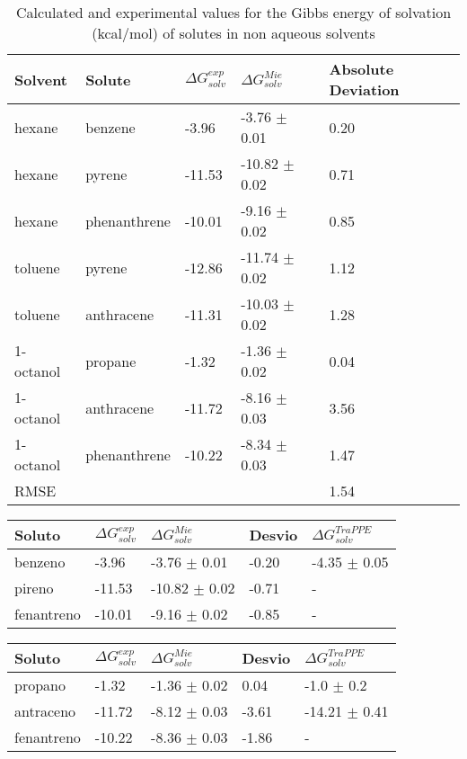 \begin{table*}[h]
\center
  \caption{Calculated and experimental values for the Gibbs energy of solvation (kcal/mol) of solutes in non aqueous solvents}
  \label{tbl:solv1}
  \begin{tabular}{lllll}
    \hline
      Solvent & Solute & $\Delta G_{solv}^{exp}$ & $\Delta G_{solv}^{Mie}$ & Absolute Deviation \\
    \hline
    hexane    & benzene      & -3.96  & -3.76  $\pm$ 0.01 & 0.20 \\
    hexane    & pyrene       & -11.53 & -10.82 $\pm$ 0.02 & 0.71 \\
    hexane    & phenanthrene & -10.01 & -9.16  $\pm$ 0.02 & 0.85 \\
    toluene   & pyrene       & -12.86 & -11.74 $\pm$ 0.02 & 1.12\\
    toluene   & anthracene   & -11.31 & -10.03 $\pm$ 0.02 & 1.28\\
    1-octanol & propane      & -1.32  & -1.36  $\pm$ 0.02 & 0.04 \\
    1-octanol & anthracene   & -11.72 & -8.16  $\pm$ 0.03 & 3.56 \\
    1-octanol & phenanthrene & -10.22 & -8.34  $\pm$ 0.03 & 1.47 \\
    \hline
    RMSE      &              &        &                   & 1.54     \\
    \hline
  \end{tabular}

\end{table*}

\begin{table*}[h]
\center
  \label{tbl:solv1tes}
  \begin{tabular}{lllll}
    \hline
     Soluto & $\Delta G_{solv}^{exp}$ & $\Delta G_{solv}^{Mie}$ & Desvio & $\Delta G_{solv}^{TraPPE}$ \\
    \hline
    benzeno      & -3.96  & -3.76  $\pm$ 0.01 & -0.20 & -4.35 $\pm$ 0.05\\
    pireno       & -11.53 & -10.82 $\pm$ 0.02 & -0.71 & -\\
    fenantreno   & -10.01 & -9.16  $\pm$ 0.02 & -0.85 & -\\
    \hline
  \end{tabular}

\end{table*}

\begin{table*}[h]
\center
  \label{tbl:solv1tes}
  \begin{tabular}{lllll}
    \hline
     Soluto & $\Delta G_{solv}^{exp}$ & $\Delta G_{solv}^{Mie}$ & Desvio & $\Delta G_{solv}^{TraPPE}$\\
    \hline
    propano      & -1.32  & -1.36  $\pm$ 0.02 & 0.04 & -1.0 $\pm$ 0.2\\
    antraceno   & -11.72 & -8.12  $\pm$ 0.03 & -3.61 & -14.21 $\pm$ 0.41\\
    fenantreno & -10.22 & -8.36  $\pm$ 0.03 & -1.86 & -\\
    \hline
  \end{tabular}

\end{table*}

